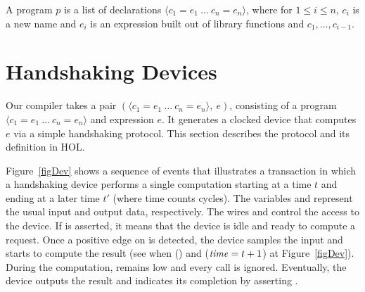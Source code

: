 \documentclass{llncs}
\begin{document}

A program $p$ is a list of declarations
$\langle c_1=e_1~\ldots~c_n=e_n\rangle$, where for $1\leq i\leq n$,
$c_i$ is a new name and $e_i$ is an expression built out of
library functions and $c_1,\ldots,c_{i-1}$.


\section{Handshaking Devices}
\label{secHandshakingDevices}


Our compiler takes a pair 
$(\langle c_1=e_1~\ldots~c_n=e_n\rangle,~e)$, consisting of a program
$\langle c_1=e_1~\ldots~c_n=e_n\rangle$ and expression
$e$.
It generates a
clocked device that computes $e$ via a simple handshaking protocol.
This section describes the protocol and its definition in HOL.

Figure~\ref{figDev} shows a sequence of events that illustrates a
transaction in which a handshaking device performs a single
computation starting at a time $t$ and ending at a later time $t'$
(where time counts cycles). 
The variables  and  represent the usual 
input and output data, respectively. The wires  
and  control the access to the device.
If  is asserted, it means that
the device is idle and ready to compute a request. 
Once a positive edge on  is detected,
the device samples the input and starts to 
compute the result (see when 
() and ($\mathit{time} = t+1$) at Figure~\ref{figDev}).
During the computation,  remains low and
every call is ignored. Eventually, the device outputs the result
and indicates its completion by asserting .
\end{document}
